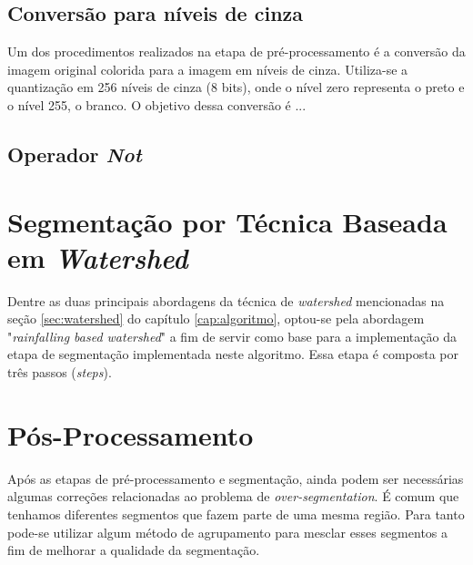 
\subsection{Conversão para níveis de cinza}
Um dos procedimentos realizados na etapa de pré-processamento é a conversão da imagem original colorida para a imagem em níveis de cinza. Utiliza-se a quantização em 256 níveis de cinza (8 bits), onde o nível zero representa o preto e o nível 255, o branco.
O objetivo dessa conversão é ...


\subsection{Operador \textit{Not}}

\section{Segmentação por Técnica Baseada em \textit{Watershed}}
Dentre as duas principais abordagens da técnica de \textit{watershed} mencionadas na seção \ref{sec:watershed} do capítulo \ref{cap:algoritmo}, optou-se pela abordagem "\textit{rainfalling based watershed}" a fim de servir como base para a implementação da etapa de segmentação implementada neste algoritmo. Essa etapa é composta por três passos (\textit{steps}). 



\section{Pós-Processamento}
Após as etapas de pré-processamento e segmentação, ainda podem ser necessárias algumas correções relacionadas ao problema de \textit{over-segmentation}. É comum que tenhamos diferentes segmentos que fazem parte de uma mesma região. Para tanto pode-se utilizar algum método de  agrupamento para mesclar esses segmentos a fim de melhorar a qualidade da segmentação.